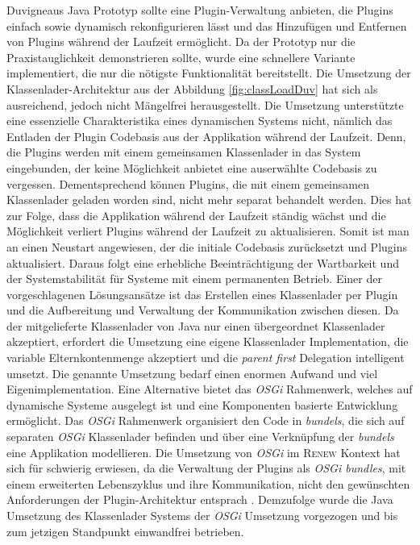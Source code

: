 			Duvigneaus Java Prototyp \cite{Duvigneau09} sollte eine Plugin-Verwaltung anbieten, die Plugins einfach sowie dynamisch rekonfigurieren lässt und das Hinzufügen und Entfernen von Plugins während der Laufzeit ermöglicht. Da der Prototyp nur die Praxistauglichkeit demonstrieren sollte, wurde eine schnellere Variante implementiert, die nur die nötigste Funktionalität bereitstellt. Die Umsetzung der Klassenlader-Architektur aus der Abbildung \ref{fig:classLoadDuv} hat sich als ausreichend, jedoch nicht Mängelfrei herausgestellt. Die Umsetzung unterstützte eine essenzielle Charakteristika eines dynamischen Systems nicht, nämlich das Entladen der Plugin Codebasis aus der Applikation während der Laufzeit. Denn, die Plugins werden mit einem gemeinsamen Klassenlader in das System eingebunden, der keine Möglichkeit anbietet eine auserwählte Codebasis zu vergessen. Dementsprechend können Plugins, die mit einem gemeinsamen Klassenlader geladen worden sind, nicht mehr separat behandelt werden. Dies hat zur Folge, dass die Applikation während der Laufzeit ständig wächst und die Möglichkeit verliert Plugins während der Laufzeit zu aktualisieren. Somit ist man an einen Neustart angewiesen, der die initiale Codebasis zurücksetzt und Plugins aktualisiert. Daraus folgt eine erhebliche Beeinträchtigung der Wartbarkeit und der Systemstabilität für Systeme mit einem permanenten Betrieb. \bigbreak
			Einer der vorgeschlagenen Lösungsansätze ist das Erstellen eines Klassenlader per Plugin und die Aufbereitung und Verwaltung der Kommunikation zwischen diesen. Da der mitgelieferte Klassenlader von Java nur einen übergeordnet Klassenlader akzeptiert, erfordert die Umsetzung eine eigene Klassenlader Implementation, die variable Elternkontenmenge akzeptiert und die \textit{parent first} Delegation intelligent umsetzt.\newline
			Die genannte Umsetzung bedarf einen enormen Aufwand und viel Eigenimplementation. Eine Alternative bietet das \textit{OSGi} Rahmenwerk, welches auf dynamische Systeme ausgelegt ist und eine Komponenten basierte Entwicklung ermöglicht. Das \textit{OSGi} Rahmenwerk organisiert den Code in \textit{bundels}, die sich auf separaten \textit{OSGi} Klassenlader befinden und über eine Verknüpfung der \textit{bundels} eine Applikation modellieren. \newline
			Die Umsetzung von \textit{OSGi} im \textsc{Renew} Kontext hat sich für schwierig erwiesen, da die Verwaltung der Plugins als \textit{OSGi bundles}, mit einem erweiterten Lebenszyklus und ihre Kommunikation, nicht den gewünschten Anforderungen der Plugin-Architektur entsprach \cite{Duvigneau09}. Demzufolge wurde die Java Umsetzung des Klassenlader Systems der \textit{OSGi} Umsetzung vorgezogen und bis zum jetzigen Standpunkt einwandfrei betrieben. \bigbreak

